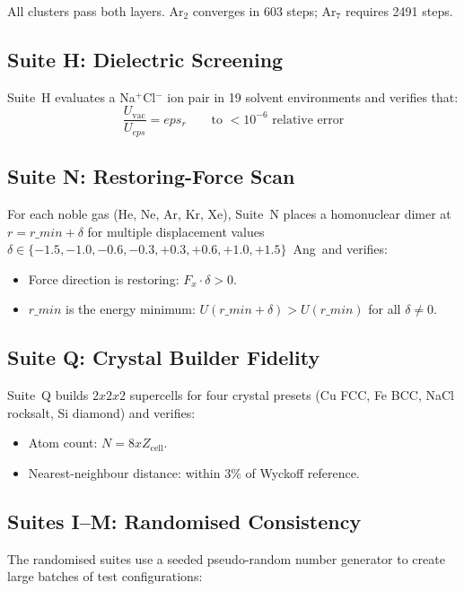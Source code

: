 \documentclass[11pt,twoside]{article}
\def\AA{Ang}%
\def\times{x}%
\def\varepsilon{eps}%
\def\rmin{r\_min}%
\newcommand{\rmin}{r_{\mathrm{min}}}
\begin{document}
All clusters pass both layers. Ar$_2$ converges in 603 steps; Ar$_7$ requires 2491 steps.

\subsection{Suite H: Dielectric Screening}

Suite~H evaluates a Na$^+$Cl$^-$ ion pair in 19 solvent environments and verifies that:
\begin{equation}
  \frac{U_{\mathrm{vac}}}{U_{\varepsilon}} = \varepsilon_r \qquad \text{to $< 10^{-6}$ relative error}
  \label{eq:dielectric-check}
\end{equation}

\subsection{Suite N: Restoring-Force Scan}

For each noble gas (He, Ne, Ar, Kr, Xe), Suite~N places a homonuclear dimer at $r = \rmin + \delta$ for multiple displacement values $\delta \in \{-1.5, -1.0, -0.6, -0.3, +0.3, +0.6, +1.0, +1.5\}$~\AA\ and verifies:
\begin{itemize}
  \item Force direction is restoring: $F_x \cdot \delta > 0$.
  \item $\rmin$ is the energy minimum: $U(\rmin + \delta) > U(\rmin)$ for all $\delta \neq 0$.
\end{itemize}

\subsection{Suite Q: Crystal Builder Fidelity}

Suite~Q builds $2 \times 2 \times 2$ supercells for four crystal presets (Cu FCC, Fe BCC, NaCl rocksalt, Si diamond) and verifies:
\begin{itemize}
  \item Atom count: $N = 8 \times Z_{\mathrm{cell}}$.
  \item Nearest-neighbour distance: within 3\% of Wyckoff reference.
\end{itemize}

\subsection{Suites I--M: Randomised Consistency}

The randomised suites use a seeded pseudo-random number generator to create large batches of test configurations:
\end{document}
